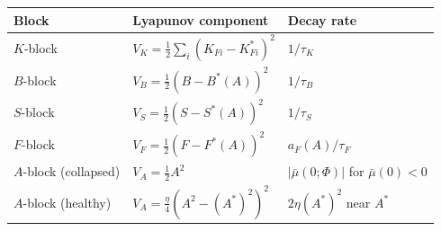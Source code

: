 \begin{tabular}{lll}
\toprule
Block & Lyapunov component & Decay rate \\
\midrule
$K$-block      & $V_K = \tfrac{1}{2}\sum_i (K_{Fi}-K_{Fi}^*)^2$ & $1/\tau_K$ \\
$B$-block      & $V_B = \tfrac{1}{2}(B-B^*(A))^2$               & $1/\tau_B$ \\
$S$-block      & $V_S = \tfrac{1}{2}(S-S^*(A))^2$               & $1/\tau_S$ \\
$F$-block      & $V_F = \tfrac{1}{2}(F-F^*(A))^2$               & $a_F(A)/\tau_F$ \\
$A$-block (collapsed)  & $V_A = \tfrac{1}{2}A^2$                & $|\bar\mu(0;\Phi)|$ for $\bar\mu(0)<0$ \\
$A$-block (healthy)    & $V_A = \tfrac{\eta}{4}(A^2-(A^*)^2)^2$ & $2\eta(A^*)^2$ near $A^*$ \\
\bottomrule
\end{tabular}